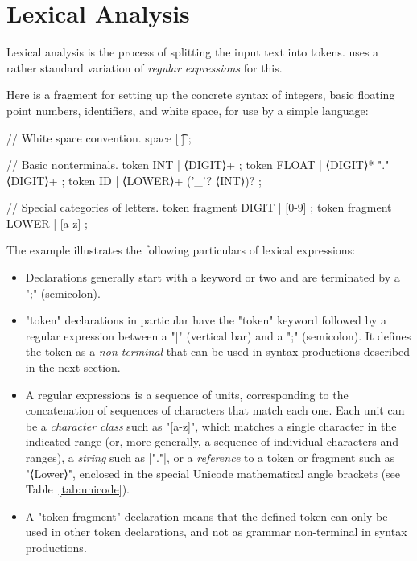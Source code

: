 \documentclass[11pt]{article} %
\begin{document}
\section{Lexical Analysis}
\label{sec:tokens}

Lexical analysis is the process of splitting the input text into tokens. \HAX uses a rather standard
variation of \emph{regular expressions} for this.

\begin{example}\label{ex:lexical}
  Here is a \HAX fragment for setting up the concrete syntax of integers, basic floating point
  numbers, identifiers, and white space, for use by a simple language:
\begin{hacs}[xleftmargin=\parindent,numbers=right,texcl]
// White space convention.
space [ \t\n] ;

// Basic nonterminals.
token INT      | ⟨DIGIT⟩+ ;
token FLOAT    | ⟨DIGIT⟩* "." ⟨DIGIT⟩+ ;
token ID       | ⟨LOWER⟩+ ('_'? ⟨INT⟩)? ;

// Special categories of letters.
token fragment DIGIT  | [0-9] ;
token fragment LOWER  | [a-z] ;
\end{hacs}
  The example illustrates the following particulars of \HAX lexical expressions:
  \begin{itemize}

  \item Declarations generally start with a keyword or two and are terminated by a ";" (semicolon).

  \item "token" declarations in particular have the "token" keyword followed by a regular expression
    between a "|" (vertical bar) and a ";" (semicolon). It defines the token as a
    \emph{non-terminal} that can be used in syntax productions described in the next section.

  \item A regular expressions is a sequence of units, corresponding to the concatenation of
    sequences of characters that match each one.  Each unit can be a \emph{character class} such as
    "[a-z]", which matches a single character in the indicated range (or, more generally, a sequence
    of individual characters and ranges), a \emph{string} such as \hacsc|"."|, or a \emph{reference}
    to a token or fragment such as "⟨Lower⟩", enclosed in the special Unicode mathematical angle
    brackets (see Table~\ref{tab:unicode}).

  \item A "token fragment" declaration means that the defined token can only be used in other token
    declarations, and not as grammar non-terminal in syntax productions.


\end{itemize}
\end{example}
\end{document}

